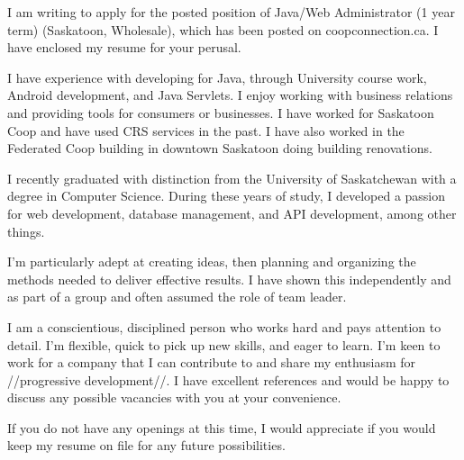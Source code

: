 \documentclass[11pt,letterpaper,sans]{moderncv}        %
\begin{document}
I am writing to apply for the posted position of Java/Web Administrator (1 year term) (Saskatoon, Wholesale), which has been posted on coopconnection.ca. I have enclosed my resume for your perusal.

I have experience with developing for Java, through University course work, Android development, and Java Servlets. I enjoy working with business relations and providing tools for consumers or businesses. I have worked for Saskatoon Coop and have used CRS services in the past. I have also worked in the Federated Coop building in downtown Saskatoon doing building renovations.

I recently graduated with distinction from the University of Saskatchewan with a degree in Computer Science. During these years of study, I developed a passion for web development, database management, and API development, among other things.

I'm particularly adept at creating ideas, then planning and organizing the methods needed to deliver effective results. I have shown this independently and as part of a group and often assumed the role of team leader.

I am a conscientious, disciplined person who works hard and pays attention to detail. I'm flexible, quick to pick up new skills, and eager to learn. I'm keen to work for a company that I can contribute to and share my enthusiasm for //progressive development//. I have excellent references and would be happy to discuss any possible vacancies with you at your convenience.

If you do not have any openings at this time, I would appreciate if you would keep my resume on file for any future possibilities.

\makeletterclosing

\end{document}
